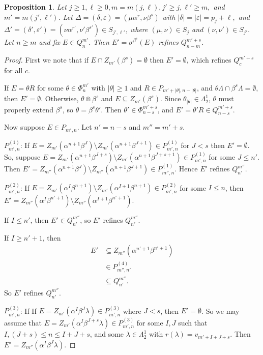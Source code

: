 \documentclass[12pt]{amsart}
\newcommand{\sm}{\setminus}
\newcommand{\sse}{\subseteq}
\newcommand{\emp}{\emptyset}
\newcommand{\al}{\alpha}
\newcommand{\be}{\beta}
\newcommand{\de}{\delta}
\newcommand{\De}{\Delta}
\newcommand{\ep}{\varepsilon}
\renewcommand{\th}{\theta}
\newcommand{\la}{\lambda}
\newcommand{\La}{\Lambda}
\newcommand{\si}{\sigma}
\theoremstyle{plain} %
\newtheorem{Proposition}[Theorem]{Proposition}
\theoremstyle{definition} %
\begin{document}
\begin{Proposition}\label{prop E' refines (c=alpha)}
    Let $j \geq 1, \ell \geq 0, m = m(j,\ell), j' \geq j, \ell' \ge m,$ and $m' = m(j', \ell')$. Let $\De = (\de, \ep) =(\mu\al^r, \nu\be^s) $ with $|\de| = |\ep| = p_j + \ell,$ and $\De' = (\de', \ep') = (\nu\al^{r'}, \nu' \be^{s'}) \in S_{j',\ell'}$, where $(\mu, \nu) \in S_j$ and $(\nu, \nu') \in S_{j'}$. Let $n \geq m$ and fix $E \in Q_n^{m'}$. Then $E' = \si^{\be^s}(E)$ refines $Q_{n-m}^{m'+s}$.
\end{Proposition}

\begin{proof}
    First we note that if $E \cap Z_{m'}(\be^s) = \emp$ then $E' = \emp$, which refines $Q_c^{m'+s}$ for all $c$. %

    If $E = \th R$ for some $\th \in \Phi_{n}^{m'}$ with $|\th| \geq 1$ and $R \in P_{m'+|\th|, n-|\th|}$, and $\th \La \cap \be^s \La = \emp$, then $E' = \emp$. 
    Otherwise, $\th \Cap \be^s$ and $E \sse Z_{m'}(\be^s)$. Since $\th_{|\th|} \in \La_2^1$, $\th$ must properly extend $\be^s$, so $\th = \be^s \th'$. Then $\th' \in \Phi_{n-s}^{m'+s}$, and $E' = \th' R \in Q_{n-s}^{m'+s}$. 

    Now suppose $E \in P_{m', n}$. Let $n' = n-s$ and $m''=m'+s$.

    $P^{(1)}_{m',n}$: If $E = Z_{m'}(\al^{n+1}\be^{J})\sm Z_{m'}(\al^{n+1}\be^{J+1}) \in P_{m',n}^{(1)}$ for $J < s$ then $E' = \emp$. So, suppose $E = Z_{m'}(\al^{n+1}\be^{J+s})\sm Z_{m'}(\al^{n+1}\be^{J+s+1}) \in P_{m',n}^{(1)}$ for some $J \leq n'$. Then $E' = Z_{m''}(\al^{n+1}\be^J)\sm Z_{m''}(\al^{n+1}\be^{J+1}) \in P_{m'',n}^{(1)}$. Hence $E'$ refines $Q_{n'}^{m''}$.

    $P^{(2)}_{m',n}$: If $E = Z_{m'}(\al^{I}\be^{n+1})\sm Z_{m'}(\al^{I+1}\be^{n+1}) \in P_{m',n}^{(2)}$ for some $I \leq n$, then $E'= Z_{m''}(\al^{I}\be^{n'+1})\sm Z_{m''}(\al^{I+1}\be^{n'+1})$.

    If $I \leq n'$, then $E' \in Q_{n'}^{m''}$, so $E'$ refines $Q_{n'}^{m''}$.

    If $I \geq n'+1$, then 
    \begin{align*}
        E' &\sse Z_{m''}(\al^{n'+1}\be^{n'+1})\\
        &\in P^{(4)}_{m'',n'}\\
        &\sse Q_{n'}^{m''}.
    \end{align*}
    So $E'$ refines $Q_{n'}^{m''}$.

    $P^{(3)}_{m',n}$: If If $E = Z_{m'}(\al^{I}\be^{J}\la) \in P_{m',n}^{(3)}$ where $J < s$, then $E' = \emp$. So we may assume that $E = Z_{m'}(\al^{I}\be^{J+s}\la) \in P_{m',n}^{(3)}$ for some $I, J$ such that $I, (J+s) \leq n \leq I+J+s$, and some $\la \in \La_2^1$ with $r(\la) = v_{m'+I+J+s}$. Then $E' = Z_{m''}(\al^I\be^J \la)$.


\end{proof}
\end{document}
